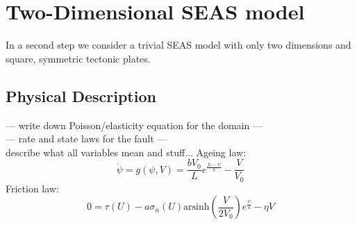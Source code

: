 \documentclass{report}
\begin{document}

\chapter{Two-Dimensional SEAS model}
In a second step we consider a trivial SEAS model with only two dimensions and square, symmetric tectonic plates.

\section{Physical Description}
\label{ssec:physicalDescriptionSEAS2D}
--- write down Poisson/elasticity equation for the domain --- \\
--- rate and state laws for the fault --- \\
describe what all variables mean and stuff...
Ageing law: 
\begin{equation}
    \dot{\psi} = g(\psi, V) = \frac{bV_0}{L}e^{\frac{f_0 - \psi}{b}} - \frac{V}{V_0}
\end{equation}
Friction law: 
\begin{equation}
    0 = \tau(U) - a\sigma_n(U) \text{arsinh}\left(\frac{V}{2V_0}\right)e^{\frac{\psi}{a}} - \eta V
\end{equation}
\end{document}
